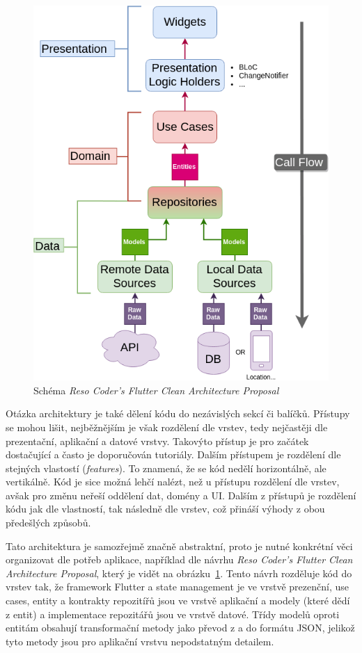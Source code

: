 \begin{figure}[t!]
    \centering
    \includegraphics[width=0.7\linewidth]{assets/technology-research/architecture/reso-coder-clean-architecture.png}
    \caption{Schéma \emph{Reso Coder's Flutter Clean Architecture Proposal}~\cite{the_clean_architecture}}
    \label{fig:reso_coder_clean_architecture}
\end{figure}

Otázka architektury je také dělení kódu do nezávislých sekcí či balíčků.
Přístupy se mohou lišit,
nejběžnějším je však rozdělení dle vrstev,
tedy nejčastěji dle prezentační, aplikační a datové vrstvy.
Takovýto přístup je pro začátek dostačující a často je doporučován tutoriály.
Dalším přístupem je rozdělení dle stejných vlastostí (\emph{features}).
To znamená,
že se kód nedělí horizontálně,
ale vertikálně.
Kód je sice možná lehčí nalézt,
než u přístupu rozdělení dle vrstev,
avšak pro změnu neřeší oddělení dat, domény a UI.
Dalším z přístupů je rozdělení kódu jak dle vlastností,
tak následně dle vrstev,
což přináší výhody z obou předešlých
způsobů.~\cite[kapitola~34]{the_clean_architecture}

Tato architektura je samozřejmě značně abstraktní,
proto je nutné konkrétní věci organizovat dle potřeb aplikace,
například dle návrhu \emph{Reso Coder's Flutter Clean Architecture Proposal},
který je vidět na obrázku~\ref{fig:reso_coder_clean_architecture}.
Tento návrh rozděluje kód do vrstev tak,
že framework Flutter a state management je ve vrstvě prezenční,
use cases, entity a kontrakty repozitířů jsou ve vrstvě aplikační
a modely (které dědí z entit) a implementace repozitářů jsou ve vrstvě datové.
Třídy modelů oproti entitám obsahují transformační metody jako
převod z a do formátu JSON,
jelikož tyto metody jsou pro aplikační vrstvu nepodstatným
detailem.~\cite{reso_coder_clean_architecture}

